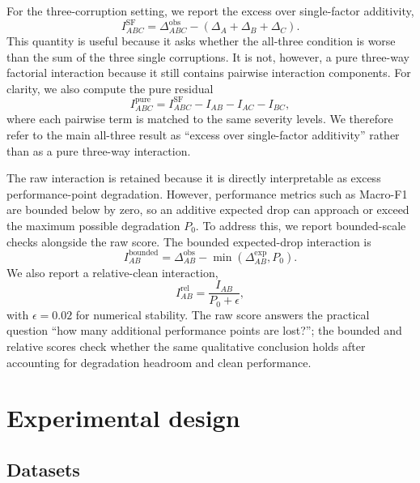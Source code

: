 \documentclass[preprint,12pt,number]{elsarticle}
\begin{document}
For the three-corruption setting, we report the excess over single-factor additivity,
\begin{equation}
    I^{\mathrm{SF}}_{ABC}=\Delta^{\mathrm{obs}}_{ABC}-(\Delta_A+\Delta_B+\Delta_C).
\end{equation}
This quantity is useful because it asks whether the all-three condition is worse than the sum of the three single corruptions. It is not, however, a pure three-way factorial interaction because it still contains pairwise interaction components. For clarity, we also compute the pure residual
\begin{equation}
    I^{\mathrm{pure}}_{ABC}=I^{\mathrm{SF}}_{ABC}-I_{AB}-I_{AC}-I_{BC},
\end{equation}
where each pairwise term is matched to the same severity levels. We therefore refer to the main all-three result as ``excess over single-factor additivity'' rather than as a pure three-way interaction.

The raw interaction is retained because it is directly interpretable as excess performance-point degradation. However, performance metrics such as Macro-F1 are bounded below by zero, so an additive expected drop can approach or exceed the maximum possible degradation $P_0$. To address this, we report bounded-scale checks alongside the raw score. The bounded expected-drop interaction is
\begin{equation}
    I^{\mathrm{bounded}}_{AB}=\Delta^{\mathrm{obs}}_{AB}-\min(\Delta^{\mathrm{exp}}_{AB},P_0).
\end{equation}
We also report a relative-clean interaction,
\begin{equation}
    I^{\mathrm{rel}}_{AB}=\frac{I_{AB}}{P_0+\epsilon},
\end{equation}
with $\epsilon=0.02$ for numerical stability. The raw score answers the practical question ``how many additional performance points are lost?''; the bounded and relative scores check whether the same qualitative conclusion holds after accounting for degradation headroom and clean performance.

\section{Experimental design}

\subsection{Datasets}
\end{document}
